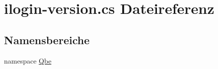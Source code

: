 \hypertarget{ilogin-version_8cs}{
\section{ilogin-version.cs Dateireferenz}
\label{ilogin-version_8cs}
}


\subsection*{Namensbereiche}
\begin{CompactItemize}
\item 
namespace \hyperlink{namespaceQbe}{Qbe}
\end{CompactItemize}
